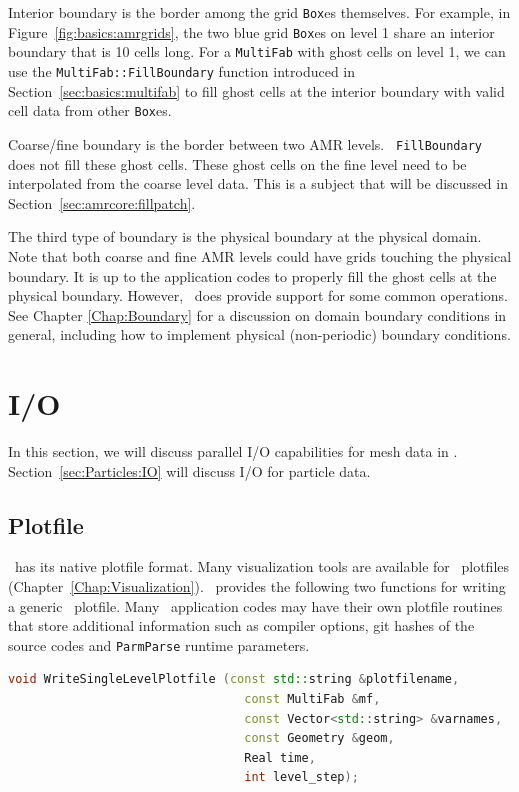 {{Interior boundary is the border among the grid {\tt Box}es themselves.
For example, in Figure~\ref{fig:basics:amrgrids}, the two blue grid
{\tt Box}es on level 1 share an interior boundary that is 10 cells
long.  For a {\tt MultiFab} with ghost cells on level 1, we can use
the {\tt MultiFab::FillBoundary} function introduced in
Section~\ref{sec:basics:multifab} to fill ghost cells at the interior
boundary with valid cell data from other {\tt Box}es.

Coarse/fine boundary is the border between two AMR levels.  {\tt
FillBoundary} does not fill these ghost cells.  These ghost cells on
the fine level need to be interpolated from the coarse level data.
This is a subject that will be discussed in
Section~\ref{sec:amrcore:fillpatch}. 

The third type of boundary is the physical boundary at the physical
domain.  Note that both coarse and fine AMR levels could have grids
touching the physical boundary.  It is up to the application codes to
properly fill the ghost cells at the physical boundary.  However,
\amrex\ does provide support for some common operations.  
See Chapter \ref{Chap:Boundary} for a discussion on domain
boundary conditions in general, including how to implement
physical (non-periodic) boundary conditions.

\section{I/O}

In this section, we will discuss parallel I/O capabilities for mesh
data in \amrex.  Section~\ref{sec:Particles:IO} will discuss I/O for
particle data.

\subsection{Plotfile}

\amrex\ has its native plotfile format.  Many visualization tools are
available for \amrex\ plotfiles
(Chapter~\ref{Chap:Visualization}).  \amrex\ provides the following
two functions for writing a generic \amrex\ plotfile.  Many \amrex\
application codes may have their own plotfile routines that store
additional information such as compiler options, git hashes of the
source codes and {\tt ParmParse} runtime parameters.
\begin{lstlisting}[language=cpp]
  void WriteSingleLevelPlotfile (const std::string &plotfilename,
                                 const MultiFab &mf,
                                 const Vector<std::string> &varnames,
                                 const Geometry &geom,
                                 Real time,
                                 int level_step);


\end{lstlisting}}}
